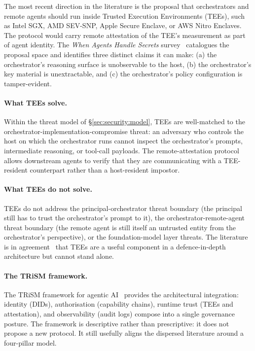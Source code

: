 The most recent direction in the literature is the
proposal that orchestrators and remote agents should run
inside Trusted Execution Environments (TEEs), such as
Intel SGX, AMD SEV-SNP, Apple Secure Enclave, or AWS
Nitro Enclaves. The protocol would carry remote
attestation of the TEE's measurement as part of agent
identity. The
\emph{When Agents Handle Secrets} survey~\cite{confidential_computing}
catalogues the proposal space and identifies three
distinct claims it can make: (a) the orchestrator's
reasoning surface is unobservable to the host,
(b) the orchestrator's key material is unextractable, and
(c) the orchestrator's policy
configuration is tamper-evident.

\paragraph{What TEEs solve.}
Within the threat model of \S\ref{sec:security:model},
TEEs are well-matched to the
orchestrator-implementation-compromise threat: an
adversary who controls the host on which the
orchestrator runs cannot inspect the orchestrator's
prompts, intermediate reasoning, or tool-call payloads.
The remote-attestation protocol allows downstream agents
to verify that they are communicating with a
TEE-resident counterpart rather than a host-resident
impostor.

\paragraph{What TEEs do not solve.}
TEEs do not address the principal-orchestrator threat
boundary (the principal still has to trust the
orchestrator's prompt to it), the
orchestrator-remote-agent threat boundary (the remote
agent is still itself an untrusted entity from the
orchestrator's perspective), or the
foundation-model layer threats. The literature is in
agreement~\cite{confidential_computing, trism} that TEEs
are a useful component in a defence-in-depth architecture
but cannot stand alone.

\paragraph{The TRiSM framework.}
The TRiSM framework for agentic AI~\cite{trism} provides
the architectural integration: identity (DIDs), authorisation
(capability chains), runtime trust (TEEs and attestation),
and observability (audit logs) compose into a single
governance posture. The framework is descriptive rather
than prescriptive: it does not propose a new protocol.
It still usefully aligns the dispersed
literature around a four-pillar model.

